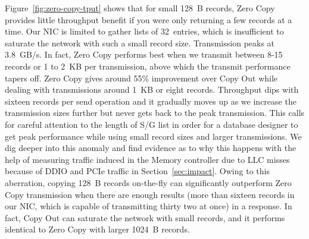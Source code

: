 
Figure~\ref{fig:zero-copy-tput} shows that for small 128~B records, Zero Copy
provides little throughput benefit if you were only returning a few records 
at a time. Our NIC is limited to gather lists
of 32~entries, which is insufficient to saturate the network with such a small
record size. Transmission peaks at 3.8~GB/s. In fact, Zero Copy performs best when
we transmit between 8-15 records or 1 to 2~KB per transmission, above which the transmit performance 
tapers off. Zero Copy gives around 55\% improvement over Copy Out while dealing 
with transmissions around 1~KB or eight records. Throughput dips with sixteen records per send operation and it gradually moves up as we 
increase the transmission sizes further but never gets back to the peak transmission. This calls 
for careful attention to the length of S/G list in order for a database designer to get peak performance while using small record sizes and larger 
transmissions. We dig deeper into this anomaly and find evidence as to why this happens with the 
help of measuring traffic induced in the Memory controller due to LLC misses because of DDIO and 
PCIe traffic in Section~\ref{sec:impact}. Owing to this aberration, copying 128~B records 
on-the-fly can significantly outperform Zero Copy transmission when there are 
enough results (more than sixteen records in our NIC, which is capable of transmitting thirty two at once) 
in a response. In fact, Copy Out can saturate the network with small records, and it
performs identical to Zero Copy with larger 1024~B records.
\newline


